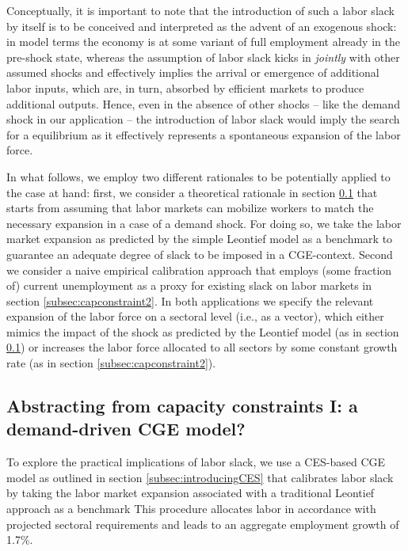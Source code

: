Conceptually, it is important to note that the introduction of such a labor slack by itself is to be conceived and interpreted as the advent of an exogenous shock: in model terms the economy is at some variant of full employment already in the pre-shock state, whereas the assumption of labor slack kicks in \textit{jointly} with other assumed shocks and effectively implies the arrival or emergence of additional labor inputs, which are, in turn, absorbed by efficient markets to produce additional outputs. Hence, even in the absence of other shocks -- like the demand shock in our application -- the introduction of labor slack would imply the search for a equilibrium as it effectively represents a spontaneous expansion of the labor force.

In what follows, we employ two different rationales to be potentially applied to the case at hand: first, we consider a theoretical rationale in section \ref{subsec:capconstraint1} that starts from assuming that labor markets can mobilize workers to match the necessary expansion in a case of a demand shock. For doing so, we take the labor market expansion as predicted by the simple Leontief model as a benchmark to guarantee an adequate degree of slack to be imposed in a CGE-context. Second we consider a naive empirical calibration approach that employs (some fraction of) current unemployment as a proxy for existing slack on labor markets in section \ref{subsec:capconstraint2}. In both applications we specify the relevant expansion of the labor force on a sectoral level (i.e., as a vector), which either mimics the impact of the shock as predicted by the Leontief model (as in section \ref{subsec:capconstraint1}) or increases the labor force allocated to all sectors by some constant growth rate (as in section \ref{subsec:capconstraint2}).

\subsection{Abstracting from capacity constraints I: a demand-driven CGE model?} \label{subsec:capconstraint1}

To explore the practical implications of labor slack, we use a CES-based CGE model as outlined in section \ref{subsec:introducingCES} that calibrates labor slack by taking the labor market expansion associated with a traditional Leontief approach as a benchmark This procedure allocates labor in accordance with projected sectoral requirements and leads to an aggregate employment growth of 1.7\%. 

